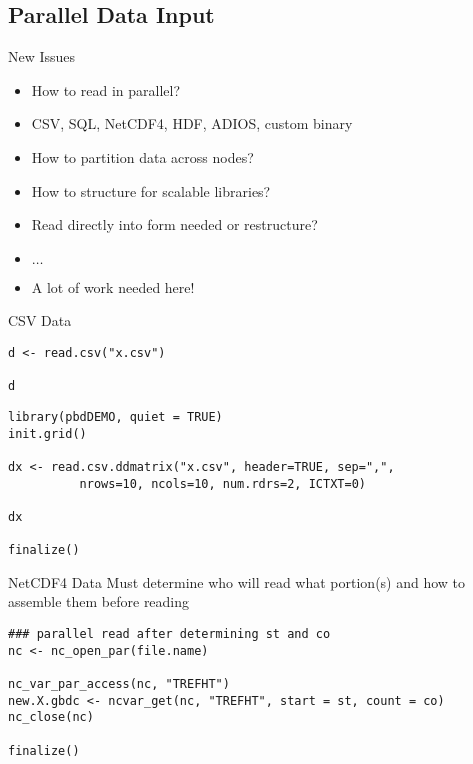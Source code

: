 \subsection{Parallel Data Input}
\makesubcontentsslidessec


\begin{frame}
  \begin{block}{New Issues}\pause
    \begin{itemize}
    \item How to read in parallel?
    \item CSV, SQL, NetCDF4, HDF, ADIOS, custom binary
    \item How to partition data across nodes?
    \item How to structure for scalable libraries?
    \item Read directly into form needed or restructure?
    \item $\ldots$
    \item A lot of work needed here!
    \end{itemize}
  \end{block}
\end{frame}



\begin{frame}[fragile]
  \begin{exampleblock}{CSV Data}\pause
\begin{lstlisting}[title=Serial Code]
d <- read.csv("x.csv")

d
\end{lstlisting}

\begin{lstlisting}[title=Parallel Code]
library(pbdDEMO, quiet = TRUE)
init.grid()

dx <- read.csv.ddmatrix("x.csv", header=TRUE, sep=",", 
          nrows=10, ncols=10, num.rdrs=2, ICTXT=0)

dx

finalize()
\end{lstlisting}
  \end{exampleblock}
\end{frame}

\begin{frame}[fragile]
  \begin{exampleblock}{NetCDF4 Data}\pause
  Must determine who will read what portion(s) and how to assemble
  them before reading
    \begin{lstlisting}
### parallel read after determining st and co
nc <- nc_open_par(file.name)

nc_var_par_access(nc, "TREFHT")
new.X.gbdc <- ncvar_get(nc, "TREFHT", start = st, count = co)
nc_close(nc)

finalize()
    \end{lstlisting}
  \end{exampleblock}
\end{frame}



